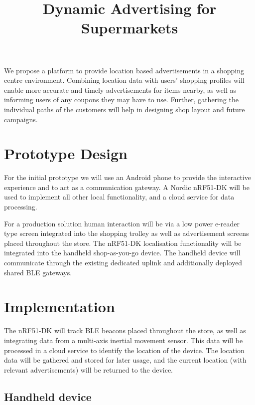 \documentclass[11pt,]{article}
\title{\vspace{-5ex}Dynamic Advertising for Supermarkets\vspace{-5ex}}\date{}
\begin{document}
\maketitle

We propose a platform to provide location based advertisements in a
shopping centre environment. Combining location data with users'
shopping profiles will enable more accurate and timely advertisements
for items nearby, as well as informing users of any coupons they may
have to use. Further, gathering the individual paths of the customers
will help in designing shop layout and future campaigns.

\hypertarget{prototype-design}{%
\section{Prototype Design}\label{prototype-design}}

For the initial prototype we will use an Android phone to provide the
interactive experience and to act as a communication gateway. A Nordic
nRF51-DK will be used to implement all other local functionality, and a
cloud service for data processing.

For a production solution human interaction will be via a low power
e-reader type screen integrated into the shopping trolley as well as
advertisement screens placed throughout the store. The nRF51-DK
localisation functionality will be integrated into the handheld
shop-as-you-go device. The handheld device will communicate through the
existing dedicated uplink and additionally deployed shared BLE gateways.

\hypertarget{implementation}{%
\section{Implementation}\label{implementation}}

The nRF51-DK will track BLE beacons placed throughout the store, as well
as integrating data from a multi-axis inertial movement sensor. This
data will be processed in a cloud service to identify the location of
the device. The location data will be gathered and stored for later
usage, and the current location (with relevant advertisements) will be
returned to the device.

\hypertarget{handheld-device}{%
\subsection{Handheld device}\label{handheld-device}}
\end{document}
